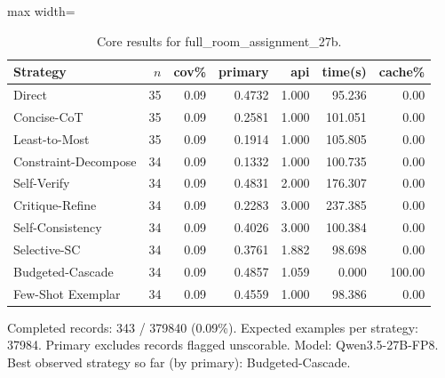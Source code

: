 \documentclass[10pt,twocolumn]{article}
\begin{document}
\begin{table}[t]
\centering
\caption{Core results for full\_room\_assignment\_27b.}
\label{tab:full_room_assignment_27b_core}
\begin{adjustbox}{max width=\textwidth}
\begin{tabular}{lrrrrrr}
\toprule
Strategy & $n$ & cov\% & primary & api & time(s) & cache\% \\
\midrule
Direct & 35 & 0.09 & 0.4732 & 1.000 & 95.236 & 0.00 \\
Concise-CoT & 35 & 0.09 & 0.2581 & 1.000 & 101.051 & 0.00 \\
Least-to-Most & 35 & 0.09 & 0.1914 & 1.000 & 105.805 & 0.00 \\
Constraint-Decompose & 34 & 0.09 & 0.1332 & 1.000 & 100.735 & 0.00 \\
Self-Verify & 34 & 0.09 & 0.4831 & 2.000 & 176.307 & 0.00 \\
Critique-Refine & 34 & 0.09 & 0.2283 & 3.000 & 237.385 & 0.00 \\
Self-Consistency & 34 & 0.09 & 0.4026 & 3.000 & 100.384 & 0.00 \\
Selective-SC & 34 & 0.09 & 0.3761 & 1.882 & 98.698 & 0.00 \\
Budgeted-Cascade & 34 & 0.09 & 0.4857 & 1.059 & 0.000 & 100.00 \\
Few-Shot Exemplar & 34 & 0.09 & 0.4559 & 1.000 & 98.386 & 0.00 \\
\bottomrule
\end{tabular}
\end{adjustbox}
\vspace{2pt}\parbox{0.98\textwidth}{\footnotesize Completed records: 343 / 379840 (0.09\%). Expected examples per strategy: 37984. Primary excludes records flagged unscorable. Model: Qwen3.5-27B-FP8. Best observed strategy so far (by primary): Budgeted-Cascade.}
\end{table}
\end{document}
